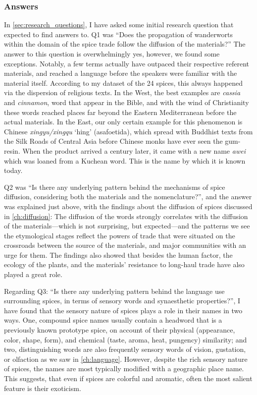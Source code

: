 \subsubsection{Answers}

In \cref{sec:research_questions}, I have asked some initial research question that expected to find answers to. Q1 was ``Does the propagation of \glspl{wanderwort} within the domain of the spice trade follow the diffusion of the materials?'' The answer to this question is overwhelmingly yes, however, we found some exceptions. Notably, a few terms actually have outpaced their respective referent materials, and reached a language before the speakers were familiar with the material itself. According to my dataset of the 24 spices, this always happened via the dispersion of religious texts. In the West, the best examples are \textit{cassia} and \textit{cinnamon}, word that appear in the Bible, and with the wind of Christianity these words reached places far beyond the Eastern Mediterranean before the actual materials. In the East, our only certain example for this phenomenon is Chinese \textit{xingyu/xingqu} `hing' (asafoetida), which spread with Buddhist texts from the Silk Roads of Central Asia before Chinese monks have ever seen the gum-resin. When the product arrived a century later, it came with a new name \textit{awei} which was loaned from a Kuchean word. This is the name by which it is known today.

Q2 was ``Is there any underlying pattern behind the mechanisms of spice diffusion, considering both the materials and the nomenclature?'', and the answer was explained just above, with the findings about the diffusion of spices discussed in \cref{ch:diffusion}: The diffusion of the words strongly correlates with the diffusion of the materials---which is not surprising, but expected---and the patterns we see the etymological stages reflect the powers of trade that were situated on the crossroads between the source of the materials, and major communities with an urge for them. The findings also showed that besides the human factor, the ecology of the plants, and the materials' resistance to long-haul trade have also played a great role.

Regarding Q3: ``Is there any underlying pattern behind the language use surrounding spices, in terms of sensory words and synaesthetic properties?'', I have found that the sensory nature of spices plays a role in their names in two ways. One, compound spice names usually contain a headword that is a previously known prototype spice, on account of their physical (appearance, color, shape, form), and chemical (taste, aroma, heat, pungency) similarity; and two, distinguishing words are also frequently sensory words of vision, gustation, or olfaction as we saw in \cref{ch:language}. However, despite the rich sensory nature of spices, the names are most typically modified with a geographic place name. This suggests, that even if spices are colorful and aromatic, often the most salient feature is their exoticism.
    
